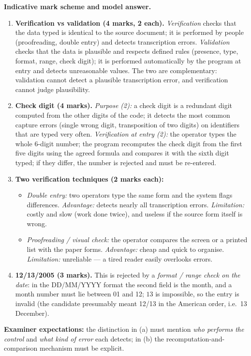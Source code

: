 \documentclass[11pt]{article}
\begin{document}
\begin{corrige}
\textbf{Indicative mark scheme and model answer.}
\begin{enumerate}
\item \textbf{Verification vs validation (4 marks, 2 each).} \emph{Verification} checks that the data typed is identical to the source document; it is performed by people (proofreading, double entry) and detects transcription errors. \emph{Validation} checks that the data is plausible and respects defined rules (presence, type, format, range, check digit); it is performed automatically by the program at entry and detects unreasonable values. The two are complementary: validation cannot detect a plausible transcription error, and verification cannot judge plausibility.
\item \textbf{Check digit (4 marks).} \emph{Purpose (2):} a check digit is a redundant digit computed from the other digits of the code; it detects the most common capture errors (single wrong digit, transposition of two digits) on identifiers that are typed very often. \emph{Verification at entry (2):} the operator types the whole 6-digit number; the program recomputes the check digit from the first five digits using the agreed formula and compares it with the sixth digit typed; if they differ, the number is rejected and must be re-entered.
\item \textbf{Two verification techniques (2 marks each):}
\begin{itemize}
\item \emph{Double entry:} two operators type the same form and the system flags differences. \emph{Advantage:} detects nearly all transcription errors. \emph{Limitation:} costly and slow (work done twice), and useless if the source form itself is wrong.
\item \emph{Proofreading / visual check:} the operator compares the screen or a printed list with the paper forms. \emph{Advantage:} cheap and quick to organise. \emph{Limitation:} unreliable — a tired reader easily overlooks errors.
\end{itemize}
\item \textbf{12/13/2005 (3 marks).} This is rejected by a \emph{format / range check on the date}: in the DD/MM/YYYY format the second field is the month, and a month number must lie between 01 and 12; $13$ is impossible, so the entry is invalid (the candidate presumably meant 12/13 in the American order, i.e.\ 13 December).
\end{enumerate}
\textbf{Examiner expectations:} the distinction in (a) must mention \emph{who performs the control} and \emph{what kind of error} each detects; in (b) the recomputation-and-comparison mechanism must be explicit.
\end{corrige}
\end{document}
